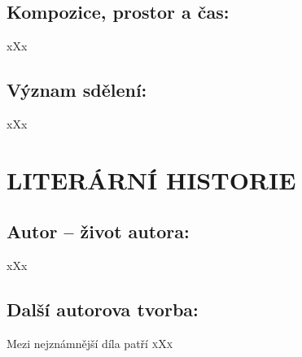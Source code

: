\documentclass{extarticle} %
\begin{document}
\subsection*{Kompozice, prostor a čas:}
\noindent 
xXx

\subsection*{Význam sdělení:}
\noindent 
xXx

\section*{LITERÁRNÍ HISTORIE}





\subsection*{Autor {\ssmall -- život autora:}}
\noindent 
xXx


\subsection*{Další autorova tvorba:}
\noindent 
Mezi nejznámnější díla patří \textsc{xXx}

\end{document}
